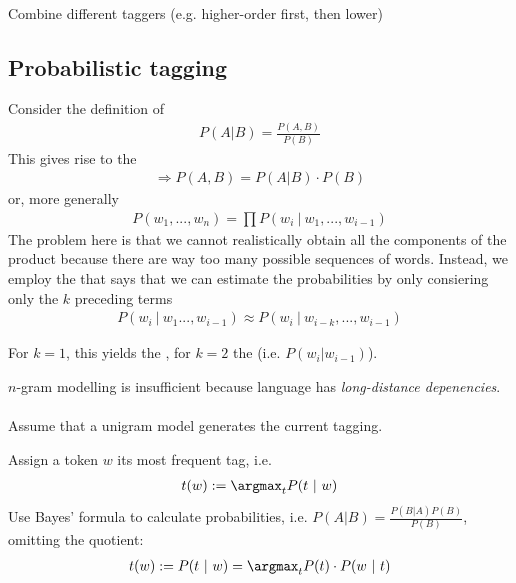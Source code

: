 \documentclass[10pt,twocolumn]{article}
\begin{document}
\paragraph{ } Combine different taggers (e.g. higher-order
first, then lower)

\subsection{Probabilistic tagging}

Consider the definition of 
\begin{align*}
  P(A|B) = \frac{P(A,B)}{P(B)} 
\end{align*}
This gives rise to the 
\begin{align*}
  \Rightarrow P(A,B) = P(A|B) \cdot P(B)
\end{align*}
or, more generally
\begin{align*}
  P(w_1, ..., w_n) = \prod P(w_i~|~w_1, ..., w_{i-1})
\end{align*}
The problem here is that we cannot realistically obtain all the components of
the product because there are way too many possible sequences of words. Instead,
we employ the  that says that we can estimate the
probabilities by only consiering only the $k$ preceding terms
\begin{align*}
  P(w_i ~|~ w_1 ..., w_{i-1}) \approx P(w_i ~|~ w_{i-k}, ..., w_{i-1})
\end{align*}

For $k=1$, this yields the , for $k=2$ the 
(i.e. $P(w_i | w_{i-1})$).

$n$-gram modelling is insufficient because language has \textit{long-distance depenencies}.

\paragraph{ } 
Assume that a unigram model generates the current tagging.

Assign a token $w$ its most frequent tag, i.e.
\begin{align*}
  t(w) := \argmax_t P(t~|~w)
\end{align*}
Use Bayes' formula to calculate probabilities, i.e. $P(A|B) = \frac{P(B|A)P(B)}{P(B)}$,
omitting the quotient:
\begin{align*}
  t(w) := P(t~|~w) = \argmax_t P(t) \cdot P(w~|~t)
\end{align*}
\end{document}
